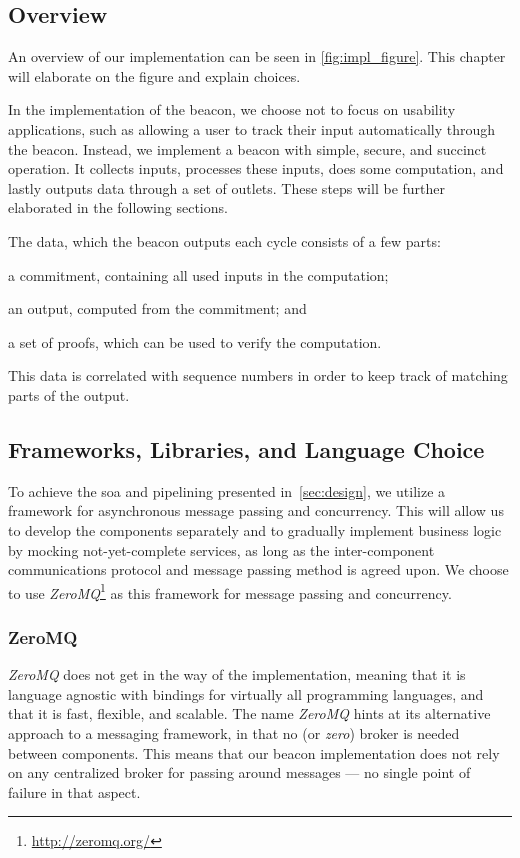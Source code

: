\subsection{Overview}%
\label{sub:overview}
An overview of our implementation can be seen in \vref{fig:impl_figure}. This chapter will elaborate on the figure and explain choices.

In the implementation of the beacon, we choose not to focus on usability applications, such as allowing a user to track their input automatically through the beacon.
Instead, we implement a beacon with simple, secure, and succinct operation.
It collects inputs, processes these inputs, does some computation, and lastly outputs data through a set of outlets.
These steps will be further elaborated in the following sections.

The data, which the beacon outputs each cycle consists of a few parts:
\begin{eletterate*}
\item a commitment, containing all used inputs in the computation;
\item an output, computed from the commitment; and
\item a set of proofs, which can be used to verify the computation.
\end{eletterate*}
This data is correlated with sequence numbers in order to keep track of matching parts of the output.

\subsection{Frameworks, Libraries, and Language Choice}
To achieve the \acrfull{soa} and pipelining presented in~\cref{sec:design}, we utilize a framework for asynchronous message passing and concurrency.
This will allow us to develop the components separately and to gradually implement business logic by mocking not-yet-complete services, as long as the inter-component communications protocol and message passing method is agreed upon.
We choose to use \textit{ZeroMQ}\footnote{\url{http://zeromq.org/}} as this framework for message passing and concurrency.

\subsubsection{ZeroMQ}
\textit{ZeroMQ} does not get in the way of the implementation, meaning that it is language agnostic with bindings for virtually all programming languages, and that it is fast, flexible, and scalable.
The name \textit{ZeroMQ} hints at its alternative approach to a messaging framework, in that no (or \textit{zero}) broker is needed between components.
This means that our beacon implementation does not rely on any centralized broker for passing around messages --- no single point of failure in that aspect.

